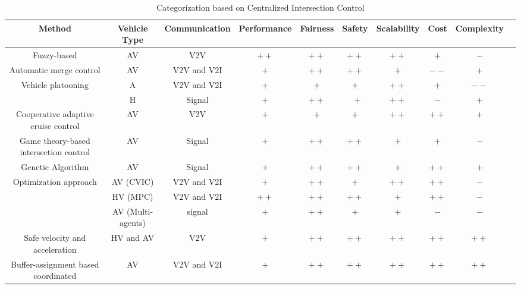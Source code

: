 \documentclass{book}
\begin{document}


\begin{landscape}

\begin{table}
\caption{\label{tab:2} Categorization based on Centralized Intersection Control}
\begin{tabular}{|c|c|c|c|c|c|c|c|c|c|}\hline
Method & \multicolumn{1}{m{2cm}|}{Vehicle Type} & \multicolumn{1}{m{1.5cm}|}{\small Communication} & \multicolumn{1}{m{2cm}|}{Performance} & Fairness & Safety & Scalability & \multicolumn{1}{|m{2.2cm}|}{Cost} & Complexity \\\hline
 \multicolumn{1}{|m{3cm}|}{Fuzzy-based}& AV &  V2V & $++$ &  $++$ & {$++$} & {$++$} & {$+$} & {$-$}\\\hline
 \multicolumn{1}{|m{3cm}|}{Automatic merge control } & AV &  V2V and V2I & $+$ & {$++$} & $++$ & $+$ & {$--$} & {$+$}  \\\hline

\multirow{2}{*}{Vehicle platooning} &  A & V2V and V2I  &  $+$   & $+$  & $+$ & $++$ & {$+$}& {$--$} \\ \cline{2-9}
& H & Signal &  $+$ &  $++$& \ $+$ & $++$ & {$-$}& {$+$} \\ \hline
\multicolumn{1}{|m{3cm}|}{Cooperative adaptive cruise control} & AV &  V2V & $+$ & $+$ & $+$ & $++$ & {$++$} & {$+$} \\\hline
\multicolumn{1}{|m{3cm}|}{Game theory-based intersection control} & AV &  Signal & $+$ & $++$ & $++$ & $+$ & {$+$} & {$-$} \\\hline
\multicolumn{1}{|m{3cm}|}{Genetic Algorithm} & AV & Signal & $+$ & $++$ & $++$ & $+$ & {$++$}& {$+$} \\\hline
\multirow{3}{*}{Optimization approach} &  AV (CVIC) & V2V and V2I  & $+$   & $++$ & $+$ & $++$ & {$++$} & {$-$} \\ \cline{2-9}
& HV (MPC) &  V2V and V2I & $++$ & $++$ & $++$& $+$ & {$++$} & {$-$}\\ \cline{2-9}
& AV (Multi-agents) &  signal & $+$ & $++$ & $+$ & $+$ & {$-$}& {$-$} \\ \hline

\multicolumn{1}{|m{3cm}|}{Safe velocity and acceleration} & HV and AV &  V2V & $+$& $++$ & $++$ & $++$ & {$++$} & {$++$} \\\hline
\multicolumn{1}{|m{3cm}|}{Buffer-assignment based coordinated}& AV &  V2V and V2I & $+$ & $++$ & $++$ &  $++$ & {$++$} & {$++$} \\\hline


\end{tabular}
\end{table}
\end{landscape}
\end{document}
